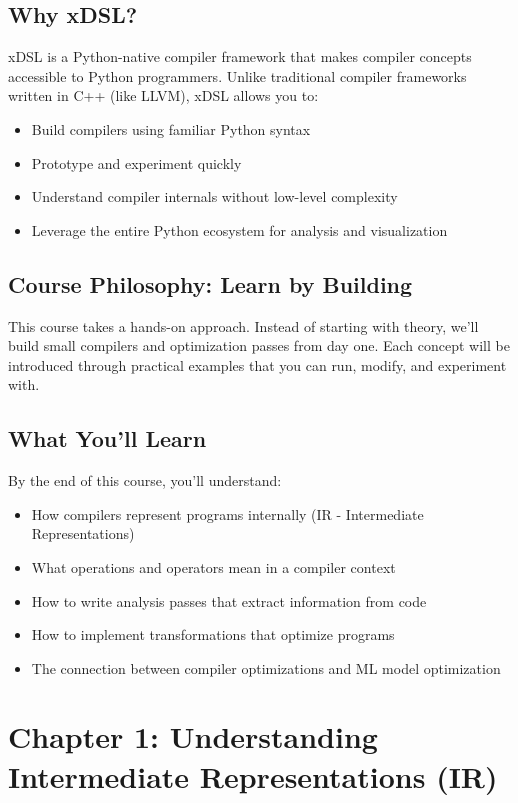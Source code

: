 \documentclass[11pt,a4paper]{article}
\begin{document}
\subsection{Why xDSL?}

xDSL is a Python-native compiler framework that makes compiler concepts accessible to Python programmers. Unlike traditional compiler frameworks written in C++ (like LLVM), xDSL allows you to:
\begin{itemize}
    \item Build compilers using familiar Python syntax
    \item Prototype and experiment quickly
    \item Understand compiler internals without low-level complexity
    \item Leverage the entire Python ecosystem for analysis and visualization
\end{itemize}

\subsection{Course Philosophy: Learn by Building}

This course takes a hands-on approach. Instead of starting with theory, we'll build small compilers and optimization passes from day one. Each concept will be introduced through practical examples that you can run, modify, and experiment with.

\subsection{What You'll Learn}

By the end of this course, you'll understand:
\begin{itemize}
    \item How compilers represent programs internally (IR - Intermediate Representations)
    \item What operations and operators mean in a compiler context
    \item How to write analysis passes that extract information from code
    \item How to implement transformations that optimize programs
    \item The connection between compiler optimizations and ML model optimization
\end{itemize}

\section{Chapter 1: Understanding Intermediate Representations (IR)}
\end{document}
